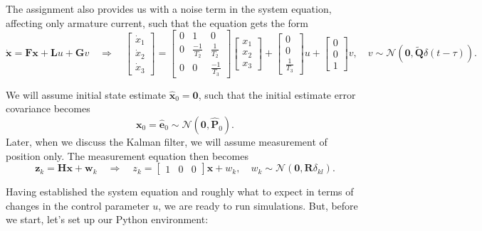 \documentclass[11pt]{article}
\begin{document}
    The assignment also provides us with a noise term in the system
equation, affecting only armature current, such that the equation gets
the form \[
\dot{\mathbf{x}} = \mathbf{F}\mathbf{x} + \mathbf{L}u + \mathbf{G}v
\quad \Rightarrow \quad
\begin{bmatrix}
\dot{x}_1 \\ \dot{x}_2 \\ \dot{x}_3
\end{bmatrix}
=
\begin{bmatrix}
0 & 1 & 0 \\
0 & \frac{-1}{T_2} & \frac{1}{T_2} \\
0 & 0 & \frac{-1}{T_3}
\end{bmatrix}
\begin{bmatrix}
x_1 \\ x_2 \\ x_3
\end{bmatrix}
+
\begin{bmatrix}
0 \\ 0 \\ \frac{1}{T_3}
\end{bmatrix}
u
+
\begin{bmatrix}
0 \\ 0 \\ 1
\end{bmatrix}
v, \quad v \sim \mathcal{N}(\mathbf{0}, \tilde{\mathbf{Q}} \delta(t-\tau)).
\]

    We will assume initial state estimate
\(\hat{\mathbf{x}}_0 = \mathbf{0}\), such that the initial estimate
error covariance becomes \[
\mathbf{x}_0 = \hat{\mathbf{e}}_0 \sim \mathcal{N}(\mathbf{0}, \hat{\mathbf{P}}_0).
\] Later, when we discuss the Kalman filter, we will assume measurement
of position only. The measurement equation then becomes \[
\mathbf{z}_k = \mathbf{Hx} + \mathbf{w}_k
\quad \Rightarrow \quad
z_k = 
\begin{bmatrix}
1 & 0 & 0
\end{bmatrix}
\mathbf{x}
+ w_k, \quad w_k \sim \mathcal{N}(\mathbf{0}, \mathbf{R} \delta_{kl}).
\]

    Having established the system equation and roughly what to expect in
terms of changes in the control parameter \(u\), we are ready to run
simulations. But, before we start, let's set up our Python environment:
\end{document}
